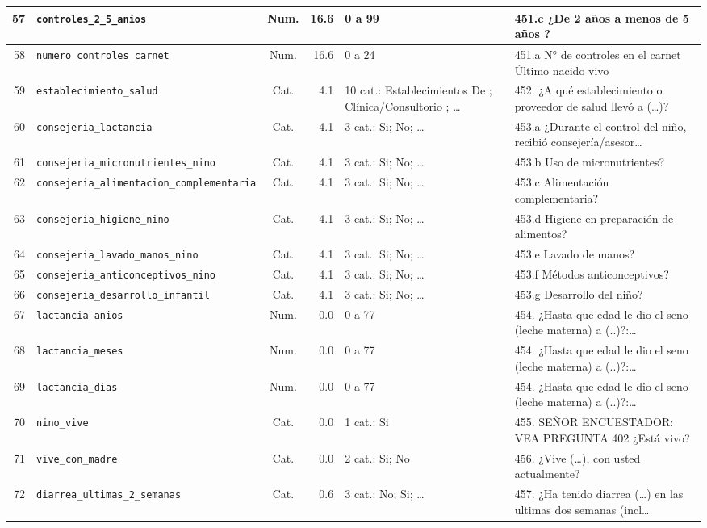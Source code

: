 \begin{longtable}{|r|p{3.1cm}|c|r|p{3.0cm}|p{3.8cm}|}
  57 & \texttt{controles\_2\_5\_anios} & Num. & 16.6 & 0 a 99 & 451.c ¿De 2 años a menos de 5 años ? \\ \hline
  58 & \texttt{numero\_controles\_carnet} & Num. & 16.6 & 0 a 24 & 451.a N° de controles en el carnet Último nacido vivo \\ \hline
  59 & \texttt{establecimiento\_salud} & Cat. & 4.1 & 10 cat.: Establecimientos De ; Clínica/Consultorio ; … & 452.  ¿A qué establecimiento o proveedor de salud llevó a (…)? \\ \hline
  60 & \texttt{consejeria\_lactancia} & Cat. & 4.1 & 3 cat.: Si; No; … & 453.a ¿Durante el control del niño, recibió consejería/asesor… \\ \hline
  61 & \texttt{consejeria\_micronutrientes\_nino} & Cat. & 4.1 & 3 cat.: Si; No; … & 453.b Uso de micronutrientes? \\ \hline
  62 & \texttt{consejeria\_alimentacion\_complementaria} & Cat. & 4.1 & 3 cat.: Si; No; … & 453.c Alimentación complementaria? \\ \hline
  63 & \texttt{consejeria\_higiene\_nino} & Cat. & 4.1 & 3 cat.: Si; No; … & 453.d Higiene en preparación de alimentos? \\ \hline
  64 & \texttt{consejeria\_lavado\_manos\_nino} & Cat. & 4.1 & 3 cat.: Si; No; … & 453.e Lavado de manos? \\ \hline
  65 & \texttt{consejeria\_anticonceptivos\_nino} & Cat. & 4.1 & 3 cat.: Si; No; … & 453.f Métodos anticonceptivos? \\ \hline
  66 & \texttt{consejeria\_desarrollo\_infantil} & Cat. & 4.1 & 3 cat.: Si; No; … & 453.g Desarrollo del niño? \\ \hline
  67 & \texttt{lactancia\_anios} & Num. & 0.0 & 0 a 77 & 454.  ¿Hasta que edad le dio el seno (leche materna) a (..)?:… \\ \hline
  68 & \texttt{lactancia\_meses} & Num. & 0.0 & 0 a 77 & 454.  ¿Hasta que edad le dio el seno (leche materna) a (..)?:… \\ \hline
  69 & \texttt{lactancia\_dias} & Num. & 0.0 & 0 a 77 & 454.  ¿Hasta que edad le dio el seno (leche materna) a (..)?:… \\ \hline
  70 & \texttt{nino\_vive} & Cat. & 0.0 & 1 cat.: Si & 455.  SEÑOR ENCUESTADOR: VEA PREGUNTA 402 ¿Está vivo? \\ \hline
  71 & \texttt{vive\_con\_madre} & Cat. & 0.0 & 2 cat.: Si; No & 456.  ¿Vive (…), con usted actualmente? \\ \hline
  72 & \texttt{diarrea\_ultimas\_2\_semanas} & Cat. & 0.6 & 3 cat.: No; Si; … & 457.  ¿Ha tenido diarrea (…) en las ultimas dos semanas (incl… \\ \hline

\end{longtable}
